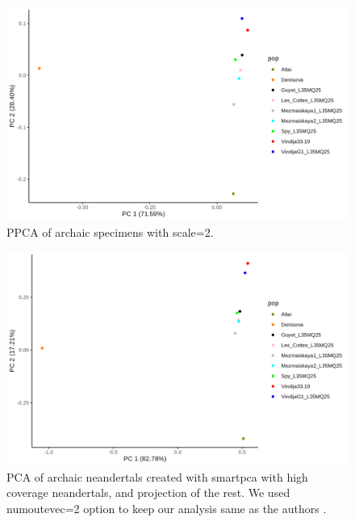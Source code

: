 \documentclass[12pt, letterpaper]{article}
\begin{document}
\begin{figure}[ht!]
    \includegraphics[width=16.5cm]{plots/neandertal_ppca.png}
    \centering
    \caption{PPCA of archaic specimens with scale=2.}
    \label{figS:ppca_nea}
\end{figure}

\begin{figure}[ht!]
    \includegraphics[width=16.5cm]{plots/neandertal_pca_smartpca.png}
    \centering
    \caption{PCA of archaic neandertals created with smartpca with high coverage neandertals, and projection of the rest. We used numoutevec=2 option to keep our analysis same as the authors \cite{mateja}.}
    \label{figS:smartpca_nea}
\end{figure}


\iffalse
\end{document}
